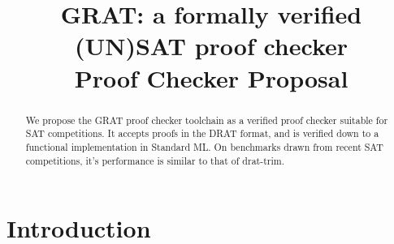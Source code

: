 \documentclass[conference]{IEEEtran}
\begin{document}
\title{GRAT: a formally verified (UN)SAT proof checker\\{\footnotesize Proof Checker Proposal}}

\author{
}

\maketitle

\begin{abstract}
We propose the GRAT proof checker toolchain as a verified proof checker suitable for SAT competitions.
It accepts proofs in the DRAT format, and is verified down to a functional implementation in Standard ML.
On benchmarks drawn from recent SAT competitions, it's performance is similar to that of drat-trim.
\end{abstract}

% 
% 

\section{Introduction}
\end{document}
